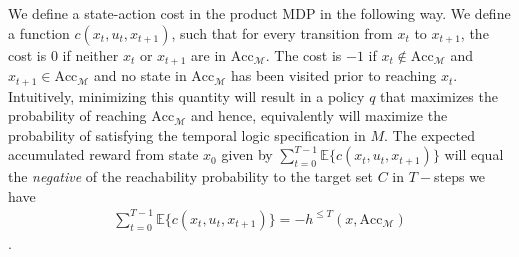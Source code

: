 We define a state-action cost in the product MDP in the following way. We define a function $c(x_t,u_t,x_{t+1})$, such that for every transition from $x_t$ to $x_{t+1}$, the cost is $0$ if neither $x_t$ or $x_{t+1}$ are in $\textrm{Acc}_{\mathcal{M}}$. The cost is $-1$ if $x_t \notin \textrm{Acc}_{\mathcal{M}}$ and $x_{t+1} \in \textrm{Acc}_{\mathcal{M}}$ and no state in $\textrm{Acc}_{\mathcal{M}}$ has been visited prior to reaching $x_t$.  Intuitively, minimizing this quantity will result in a policy $q$ that maximizes the probability of reaching $\textrm{Acc}_{\mathcal{M}}$ and hence, equivalently will maximize the probability of satisfying the temporal logic specification in $M$. The expected accumulated reward from state $x_0$ given by $\sum_{t=0}^{T-1}\mathbb{E}\{c(x_t,u_t,x_{t+1})\}$ will equal the \emph{negative} of the reachability probability to the target set $C$ in $T-$steps \ie we have
\vspace{-0.2cm}
\begin{align}\label{eqn:cost}
\sum_{t=0}^{T-1}\mathbb{E}\{c(x_t,u_t,x_{t+1})\} = -h^{\leq T}(x,\textrm{Acc}_{\mathcal{M}})
\end{align}.
\vspace{-0.3cm}




